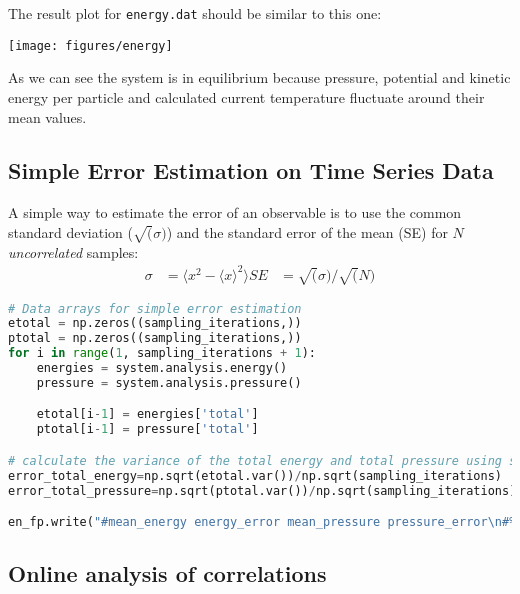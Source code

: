 \documentclass[
paper=a4,                       %
fontsize=11pt,                  %
twoside,                        %
footsepline,                    %
headsepline,                    %
headinclude=false,              %
footinclude=false,              %
pagesize,                       %
]{scrartcl}
\begin{document}
The result plot for \texttt{energy.dat}
should be similar to this one:
\begin{center}
  \texttt{[image: figures/energy]}
\end{center}
\noindent As we can see the system is in equilibrium because pressure, potential and kinetic energy per particle 
and calculated current temperature fluctuate around their mean values.

   
\subsection{Simple Error Estimation on Time Series Data}
A simple way to estimate the error of an observable is to use the common standard
deviation ($\sqrt(\sigma)$) and the standard error of the mean (SE) for $N$
\emph{uncorrelated} samples:
\begin{align}
    \sigma  &= \langle x^2 - \langle x\rangle^2 \rangle
    SE      &= \sqrt(\sigma)/\sqrt(N)
    \label{eq:variance}
\end{align}

\begin{lstlisting}[language=Python]
# Data arrays for simple error estimation
etotal = np.zeros((sampling_iterations,))
ptotal = np.zeros((sampling_iterations,))
for i in range(1, sampling_iterations + 1):
    energies = system.analysis.energy()
    pressure = system.analysis.pressure()

    etotal[i-1] = energies['total']
    ptotal[i-1] = pressure['total']

# calculate the variance of the total energy and total pressure using scipys statistic operations
error_total_energy=np.sqrt(etotal.var())/np.sqrt(sampling_iterations)
error_total_pressure=np.sqrt(ptotal.var())/np.sqrt(sampling_iterations)

en_fp.write("#mean_energy energy_error mean_pressure pressure_error\n#%1.5e %1.5e %1.5e %1.5e" % \
\end{lstlisting}


\newpage

\subsection{Online analysis of correlations}
\label{subsection:online_analysis}
\end{document}
